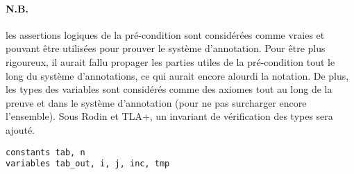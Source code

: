 \documentclass[a4paper, 11pt]{article}
\theoremstyle{mystyle}
\begin{document}
\paragraph{N.B.} les assertions logiques de la pré-condition sont considérées comme vraies et pouvant être utilisées pour prouver le système d'annotation. Pour être plus rigoureux, il aurait fallu propager les parties utiles de la pré-condition tout le long du système d'annotations, ce qui aurait encore alourdi la notation. De plus, les types des variables sont considérés comme des axiomes tout au long de la preuve et dans le système d'annotation (pour ne pas surcharger encore l'ensemble). Sous Rodin et TLA+, un invariant de vérification des types sera ajouté.

\begin{lstlisting}[language=prooflang, mathescape,
    basicstyle=\ttfamily\large\color{blue!90!black},
    keywordstyle=\bfseries,
    tabsize=4]
constants tab, n
variables tab_out, i, j, inc, tmp


\end{lstlisting}
\end{document}
